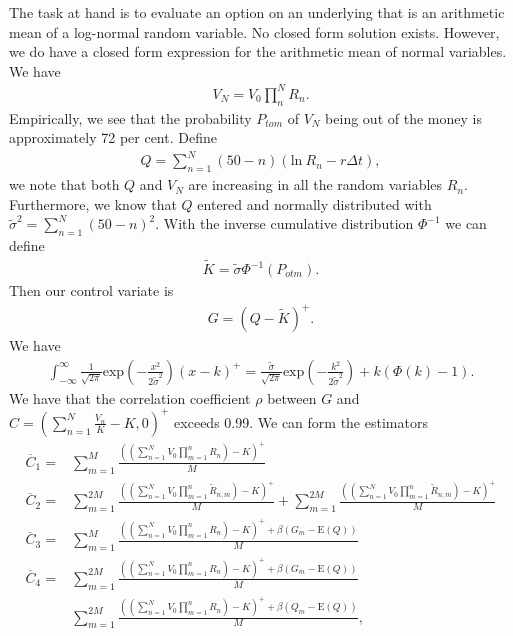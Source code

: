 \documentclass[a4paper,11pt]{article}
\newcommand{\expf}[1]{\mathrm{exp}\left ( {#1}\right )}
\newcommand{\parent}[1]{\left( {#1} \right)}
\newcommand{\ssum}[2]{\displaystyle\sum\limits_{#1}^{#2}}
\newcommand{\pprod}[2]{\displaystyle\prod\limits_{#1}^{#2}}
\newcommand{\expp}[1]{\mathrm{E} \parent{{#1}}}
\begin{document}
The task at hand is to evaluate an option on an underlying that is an arithmetic
mean of a log-normal random variable. No closed form solution exists. However,
we do have a closed form expression for the arithmetic mean of normal variables.
We have
\begin{align}
V_N=V_0 \pprod{n}{N} R_n.
\end{align}
Empirically, we see that the probability $P_{tom}$ of $V_N$ being out of the money is
approximately 72 per cent.
Define
\begin{align}
Q = \ssum{n=1}{N} \parent{50-n} \parent{\mathrm{ln}~R_n - r \Delta t},
\end{align}
we note that both $Q$ and $V_N$ are increasing in all the random variables
$R_n$. Furthermore, we know that $Q$ entered and normally distributed with
$\tilde \sigma^2 = \ssum{n=1}{N} \parent{50-n}^2$. With the inverse cumulative distribution
$\Phi^{-1}$ we can define
\begin{align}
\tilde K = \tilde \sigma \Phi^{-1} \parent{P_{otm}}.
\end{align}
Then our control variate is
\begin{align}
G=\parent{Q-\tilde K}^+.
\end{align}
We have
\begin{align}
\int_{-\infty}^{\infty} \frac{1}{\sqrt{2 \pi}} \expf{-\frac{x^2}{2 \tilde \sigma^2}} \parent{x-k}^+
 =
 \frac{\tilde \sigma}{\sqrt{2 \pi}}
 \expf{-\frac{k^2}{2 \tilde \sigma^2}}
 +k \parent{\Phi \parent{k} -1}.
\end{align}
We have that the correlation coefficient $\rho$ between 
$G$ and $C = \parent{\ssum{n=1}{N}\frac{V_n}{K}-K,0}^+$
exceeds 0.99.
We can form the estimators
\begin{align}
\overline C_1 =& \ssum{m=1}{M} \frac{ \parent{\parent{ \ssum{n=1}{N} V_0 \pprod{m=1}{n} R_n}-K}^+ }{M}
\\
\overline C_2 =& \ssum{m=1}{2M} \frac{ \parent{\parent{ \ssum{n=1}{N} V_0 \pprod{m=1}{n} \tilde R_{n,m}}-K}^+ }{M} + 
 \ssum{m=1}{2M} \frac{ \parent{\parent{ \ssum{n=1}{N} V_0 \pprod{m=1}{n} \tilde R_{n,m}}-K}^+ }{M}
 \\
 \overline C_3 =& \ssum{m=1}{M} \frac{ \parent{\parent{ \ssum{n=1}{N} V_0 \pprod{m=1}{n} R_n}-K}^+  + \beta \parent {G_m - \expp{Q}}}{M}
\\
\overline C_4 =& \ssum{m=1}{2M} \frac{ \parent{\parent{ \ssum{n=1}{N} V_0 \pprod{m=1}{n} R_n}-K}^+  + \beta \parent{G_m - \expp{Q}}}{M}
\nonumber
\\
& \ssum{m=1}{2M} \frac{ \parent{\parent{ \ssum{n=1}{N} V_0 \pprod{m=1}{n} R_n}-K}^+  + \beta \parent{Q_m - \expp{Q}}}{M},
\end{align}
\end{document}
